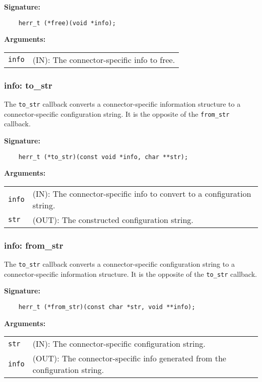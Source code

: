 \begin{mdframed}[style=bgbox]
\textbf{Signature:}
\begin{lstlisting}
    herr_t (*free)(void *info);
\end{lstlisting}
\textbf{Arguments:}\\
\begin{tabular}{l p{13.5cm}}
  \texttt{info} & (IN): The connector-specific info to free.\\
\end{tabular}
\end{mdframed}

\subsubsection{info: to\_str}
The \texttt{to\_str} callback converts a connector-specific information structure to a connector-specific configuration string. It is the opposite of the \texttt{from\_str} callback.

\begin{mdframed}[style=bgbox]
\textbf{Signature:}
\begin{lstlisting}
    herr_t (*to_str)(const void *info, char **str);
\end{lstlisting}
\textbf{Arguments:}\\
\begin{tabular}{l p{13.5cm}}
  \texttt{info} & (IN): The connector-specific info to convert to a configuration string.\\
  \texttt{str} & (OUT): The constructed configuration string.\\
\end{tabular}
\end{mdframed}

\subsubsection{info: from\_str}
The \texttt{to\_str} callback converts a connector-specific configuration string to a connector-specific information structure. It is the opposite of the \texttt{to\_str} callback.

\begin{mdframed}[style=bgbox]
\textbf{Signature:}
\begin{lstlisting}
    herr_t (*from_str)(const char *str, void **info);
\end{lstlisting}
\textbf{Arguments:}\\
\begin{tabular}{l p{13.5cm}}
  \texttt{str} & (IN): The connector-specific configuration string.\\
  \texttt{info} & (OUT): The connector-specific info generated from the configuration string.\\
\end{tabular}
\end{mdframed}


